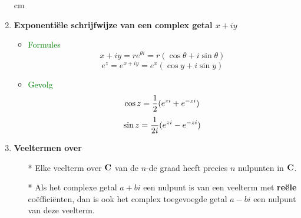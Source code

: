 \begin{enumerate}
\begin{itemize}
\end{itemize} cm
\item \hypertarget{exponentiele_vorm}{{\bf Exponenti\"ele schrijfwijze van een complex getal $x+iy$}}\label{exponentiele_vorm}
\begin{itemize}%
\item \textcolor{green}{Formules}
\[x+iy=r e^{\theta i}=r(\cos\theta+i\sin\theta)\]
\[e^z=e^{x+iy}=e^x(\cos y+i\sin y)\]
\item \textcolor{green}{Gevolg}
\[\cos z =\displaystyle\frac{\displaystyle 1}{\displaystyle 2}(e^{zi}+e^{-zi})\]
\[\sin z =\displaystyle\frac{\displaystyle 1}{\displaystyle 2i}(e^{zi}-e^{-zi})\]
\end{itemize}%
\item \hypertarget{veeltermen_over_C}{{\bf Veeltermen over \C}}\label{veeltermen_over_C}
\begin{itemize}%
\item[*] Elke veelterm over $\mbox{$\bf C $}$ van de $n$-de graad heeft precies $n$ nulpunten in $\mbox{$\bf C $}$.
\item[*] Als het complexe getal $a+bi$ een nulpunt is van een veelterm met {\bf re\"ele} co\"effici\"enten, dan is ook het complex toegevoegde getal $a-bi$ een nulpunt van deze veelterm.
\end{itemize} %
\end{enumerate}%

